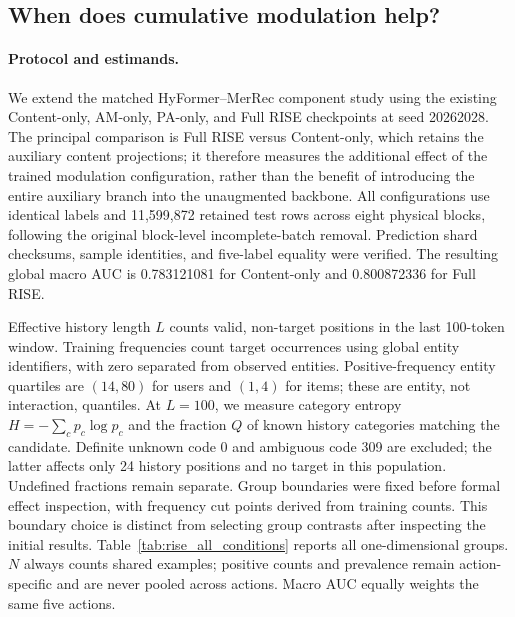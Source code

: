\subsection{When does cumulative modulation help?}
\label{sec:rise_component_conditions}

\paragraph{Protocol and estimands.}
We extend the matched HyFormer--MerRec component study using the existing
Content-only, AM-only, PA-only, and Full RISE checkpoints at seed 20262028.
The principal comparison is Full RISE versus Content-only, which retains the
auxiliary content projections; it therefore measures the additional effect of
the trained modulation configuration, rather than the benefit of introducing
the entire auxiliary branch into the unaugmented backbone. All configurations
use identical labels and 11,599,872 retained test rows across eight physical
blocks, following the original block-level incomplete-batch removal. Prediction
shard checksums, sample identities, and five-label equality were verified.
The resulting global macro AUC is 0.783121081 for Content-only and
0.800872336 for Full RISE.

Effective history length $L$ counts valid, non-target positions in the last
100-token window. Training frequencies count target occurrences using global
entity identifiers, with zero separated from observed entities. Positive-frequency
entity quartiles are $(14,80)$ for users and $(1,4)$ for items; these are entity,
not interaction, quantiles. At $L=100$, we measure category entropy
$H=-\sum_c p_c\log p_c$ and the fraction $Q$ of known history categories matching
the candidate. Definite unknown code 0 and ambiguous code 309 are excluded;
the latter affects only 24 history positions and no target in this population.
Undefined fractions remain separate. Group boundaries were fixed before
formal effect inspection, with frequency cut points derived from training counts.
This boundary choice is distinct from selecting group contrasts after inspecting
the initial results. Table~\ref{tab:rise_all_conditions} reports
all one-dimensional groups. $N$ always counts shared examples; positive
counts and prevalence remain action-specific and are never pooled across
actions. Macro AUC equally weights the same five actions.


